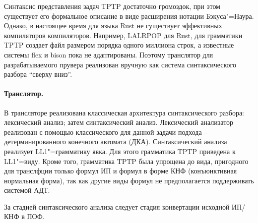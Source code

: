 \documentclass[a4paper]{jctart15b}
\begin{document}




Синтаксис представления задач TPTP достаточно громоздок, при этом существует его формальное описание в виде расширения нотации Бэкуса"=Наура. Однако, в настоящее время для языка Rust не существует эффективных компиляторов компиляторов. Например, LALRPOP для Rust, для грамматики TPTP создает файл размером порядка одного миллиона строк, а известные системы flex и bison пока не адаптированы. Поэтому транслятор для разрабатываемого прувера реализован вручную как система синтаксического разбора ``сверху вниз''.

\paragraph{Транслятор.}
В трансляторе реализована классическая архитектура синтаксического разбора: лексический анализ; затем синтаксический анализ. Лексический анализатор реализован с помощью классического для данной задачи подхода -- детерминированного конечного автомата (ДКА). Синтаксический анализа реализует LL1"=грамматику явка. Для этого грамматика TPTP приведена к LL1"=виду. Кроме того, грамматика TPTP была упрощена до вида, пригодного для транслфции только формул ИП и формул в форме КНФ (конъюнктивная нормальная форма), так как другие виды формул не предполагается поддерживать системой АДТ.

За стадией синтаксического анализа следует стадия конвертации исходной ИП/КНФ в ПОФ. %
\end{document}

